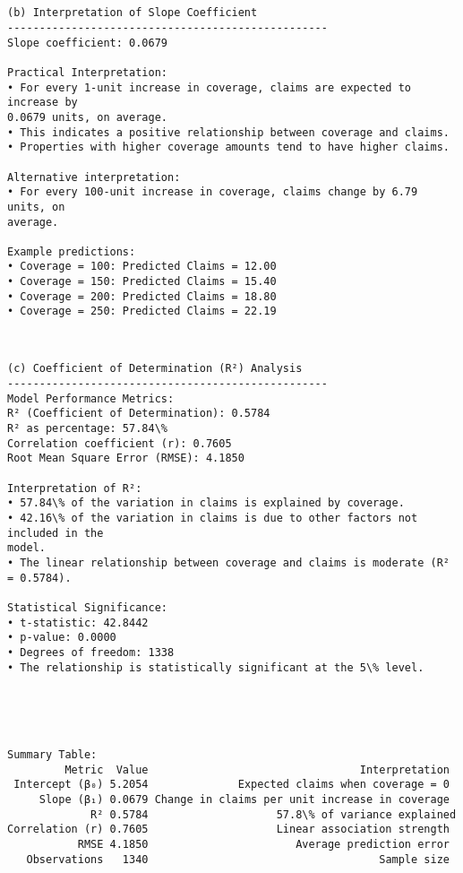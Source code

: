 \documentclass[8pt, twocolumn]{extarticle}
\begin{document}
    \begin{Verbatim}[commandchars=\\\{\}]


(b) Interpretation of Slope Coefficient
--------------------------------------------------
Slope coefficient: 0.0679

Practical Interpretation:
• For every 1-unit increase in coverage, claims are expected to increase by
0.0679 units, on average.
• This indicates a positive relationship between coverage and claims.
• Properties with higher coverage amounts tend to have higher claims.

Alternative interpretation:
• For every 100-unit increase in coverage, claims change by 6.79 units, on
average.

Example predictions:
• Coverage = 100: Predicted Claims = 12.00
• Coverage = 150: Predicted Claims = 15.40
• Coverage = 200: Predicted Claims = 18.80
• Coverage = 250: Predicted Claims = 22.19
    \end{Verbatim}

    \begin{Verbatim}[commandchars=\\\{\}]


(c) Coefficient of Determination (R²) Analysis
--------------------------------------------------
Model Performance Metrics:
R² (Coefficient of Determination): 0.5784
R² as percentage: 57.84\%
Correlation coefficient (r): 0.7605
Root Mean Square Error (RMSE): 4.1850

Interpretation of R²:
• 57.84\% of the variation in claims is explained by coverage.
• 42.16\% of the variation in claims is due to other factors not included in the
model.
• The linear relationship between coverage and claims is moderate (R² = 0.5784).

Statistical Significance:
• t-statistic: 42.8442
• p-value: 0.0000
• Degrees of freedom: 1338
• The relationship is statistically significant at the 5\% level.
    \end{Verbatim}

    \begin{center}
    \end{center}
    { \hspace*{\fill} \\}
    
    \begin{Verbatim}[commandchars=\\\{\}]


Summary Table:
         Metric  Value                                 Interpretation
 Intercept (β₀) 5.2054              Expected claims when coverage = 0
     Slope (β₁) 0.0679 Change in claims per unit increase in coverage
             R² 0.5784                    57.8\% of variance explained
Correlation (r) 0.7605                    Linear association strength
           RMSE 4.1850                       Average prediction error
   Observations   1340                                    Sample size
    \end{Verbatim}
\end{document}
